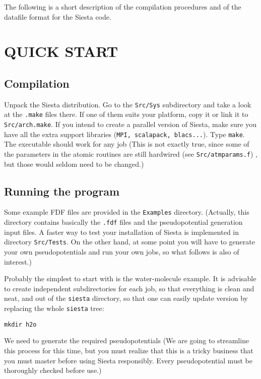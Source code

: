 \documentclass[11pt]{article}
\begin{document}
The following is a short description of the compilation procedures
and of the datafile format for the {\sc Siesta} code.

\section{QUICK START}

\subsection{Compilation}
Unpack the {\sc Siesta} distribution. Go to the {\tt Src/Sys}
subdirectory and take a look at the {\tt .make} files there. If one of
them suits your platform, copy it or link it to {\tt
Src/arch.make}. If you intend to create a parallel version of {\sc
Siesta}, make sure you have all the extra support libraries ({\tt MPI,
scalapack, blacs...}).  Type {\tt make}. The executable should work
for any job (This is not exactly true, since some of the parameters in
the atomic routines are still hardwired (see {\tt Src/atmparams.f}) ,
but those would seldom need to be changed.)

\subsection{Running the program}

Some example FDF files are provided in the {\tt Examples}
directory. (Actually, this directory contains basically the {\tt .fdf}
files and the pseudopotential generation input files. A faster way to
test your installation of {\sc Siesta} is implemented in directory
{\tt Src/Tests}. On the other hand, at some point you
will have to generate your own pseudopotentials and run your own jobs,
so what follows is also of interest.)

Probably the simplest to start with is the water-molecule
example. It is advisable to create independent subdirectories for each
job, so that everything is clean and neat, and out of the {\tt siesta}
directory, so that one can easily update version by replacing the
whole {\tt siesta} tree:

{\tt mkdir h2o}

\noindent
We need to generate the required pseudopotentials
(We are going to streamline this process for this time, but
you must realize that this is a tricky business that you 
must master before using {\sc Siesta} responsibly. Every 
pseudopotential must be thoroughly checked before use.)
\end{document}
